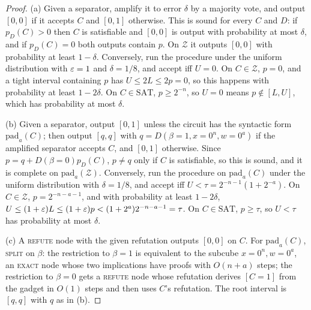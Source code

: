 \begin{proof}
(a) Given a separator, amplify it to error $\delta$ by a majority vote, and output
$[0,0]$ if it accepts $C$ and $[0,1]$ otherwise. This is sound for every $C$ and
$D$: if $p_D(C)>0$ then $C$ is satisfiable and $[0,0]$ is output with probability at
most $\delta$, and if $p_D(C)=0$ both outputs contain $p$. On $\mathcal Z$ it
outputs $[0,0]$ with probability at least $1-\delta$. Conversely, run the procedure
under the uniform distribution with $\varepsilon=1$ and $\delta=1/8$, and accept iff $U=0$.
On $C\in\mathcal Z$, $p=0$, and a tight interval containing $p$ has $U\le2L\le2p=0$,
so this happens with probability at least $1-2\delta$. On $C\in\mathrm{SAT}$,
$p\ge2^{-n}$, so $U=0$ means $p\notin[L,U]$, which has probability at most $\delta$.

(b) Given a separator, output $[0,1]$ unless the circuit has the syntactic form
$\mathrm{pad}_a(C)$; then output $[q,q]$ with $q=D(\beta=1,x=0^n,w=0^a)$ if the
amplified separator accepts $C$, and $[0,1]$ otherwise. Since $p=q+D(\beta=0)p_D(C)$,
$p\ne q$ only if $C$ is satisfiable, so this is sound, and it is complete on
$\mathrm{pad}_a(\mathcal Z)$. Conversely, run the procedure on $\mathrm{pad}_a(C)$
under the uniform distribution with $\delta=1/8$, and accept iff
$U<\tau=2^{-n-1}(1+2^{-a})$. On $C\in\mathcal Z$, $p=2^{-n-a-1}$, and with probability
at least $1-2\delta$, $U\le(1+\varepsilon)L\le(1+\varepsilon)p<(1+2^a)2^{-n-a-1}=\tau$. On
$C\in\mathrm{SAT}$, $p\ge\tau$, so $U<\tau$ has probability at most $\delta$.

(c) A \textsc{refute} node with the given refutation outputs $[0,0]$ on $C$. For
$\mathrm{pad}_a(C)$, \textsc{split} on $\beta$: the restriction to $\beta=1$ is
equivalent to the subcube $x=0^n,w=0^a$, an \textsc{exact} node whose two
implications have proofs with $O(n+a)$ steps; the restriction to $\beta=0$ gets a
\textsc{refute} node whose refutation derives $[C=1]$ from the gadget in $O(1)$ steps
and then uses $C$'s refutation. The root interval is $[q,q]$ with $q$ as in (b).
\end{proof}

